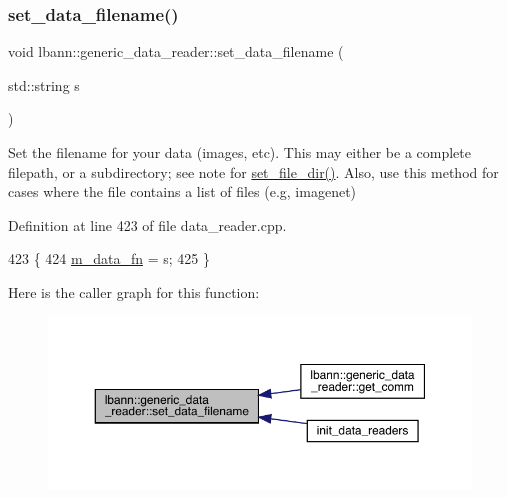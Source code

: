 \subsubsection{\texorpdfstring{set\+\_\+data\+\_\+filename()}{set\_data\_filename()}}
{\footnotesize\ttfamily void lbann\+::generic\+\_\+data\+\_\+reader\+::set\+\_\+data\+\_\+filename (\begin{DoxyParamCaption}\item[{std\+::string}]{s }\end{DoxyParamCaption})}

Set the filename for your data (images, etc). This may either be a complete filepath, or a subdirectory; see note for \hyperlink{classlbann_1_1generic__data__reader_a94a6db0b62d4c98202ef309eb76b220c}{set\+\_\+file\+\_\+dir()}. Also, use this method for cases where the file contains a list of files (e.\+g, imagenet) 

Definition at line 423 of file data\+\_\+reader.\+cpp.


\begin{DoxyCode}
423                                                        \{
424   \hyperlink{classlbann_1_1generic__data__reader_a2595e254ab2442e8cfc80aa6bdac0c0f}{m\_data\_fn} = s;
425 \}
\end{DoxyCode}
Here is the caller graph for this function\+:\nopagebreak
\begin{figure}[H]
\begin{center}
\leavevmode
\includegraphics[width=350pt]{classlbann_1_1generic__data__reader_a74b7ef4fe0dc7d3a96868ca3b5fbf897_icgraph}
\end{center}
\end{figure}
\mbox{\label{classlbann_1_1generic__data__reader_a94a6db0b62d4c98202ef309eb76b220c}} 
